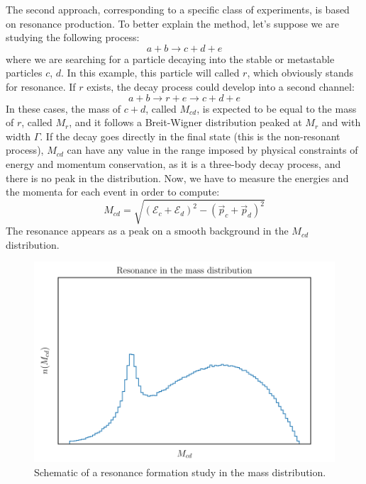 The second approach, corresponding to a specific class of experiments, is based on resonance production. To better explain the method, let's suppose we are studying the following process:
\begin{equation}
	a + b \longrightarrow c + d + e
\end{equation}
where we are searching for a particle decaying into the stable or metastable particles $c$, $d$. In this example, this particle will called $r$, which obviously stands for resonance. If $r$ exists, the decay process could develop into a second channel:
\begin{equation}
	a + b \longrightarrow r + e \longrightarrow c + d + e
\end{equation}
In these cases, the mass of $c+d$, called $M_{cd}$, is expected to be equal to the mass of $r$, called $M_{r}$, and it follows a Breit-Wigner distribution peaked at $M_{r}$ and with width $\Gamma$. If the decay goes directly in the final state (this is the non-resonant process), $M_{cd}$ can have any value in the range imposed by physical constraints of energy and momentum conservation, as it is a three-body decay process, and there is no peak in the distribution. Now, we have to measure the energies and the momenta for each event in order to compute:
\begin{equation}
	M_{cd} = \sqrt{(\mathcal{E}_{c} + \mathcal{E}_{d})^2 - (\vec{p}_{c} + \vec{p}_{d})^2}
\end{equation}
The resonance appears as a peak on a smooth background in the $M_{cd}$ distribution.


\begin{figure}[H]
\centering%
\begin{minipage}{0.4\textwidth}
	\centering
	
\end{minipage}
%
\begin{minipage}{0.4\textwidth}\centering
	\includegraphics[width=1.0\linewidth]{Python/LHC/RES/res2.pdf}
\end{minipage}%

\caption{Schematic of a resonance formation study in the mass distribution.}
\label{fig:INVARIANT_MASS_RESONANCE}
\end{figure}







